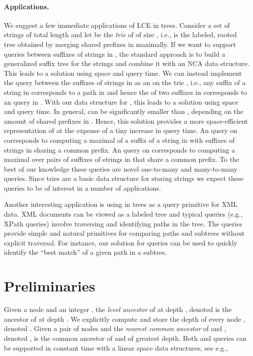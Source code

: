 \documentclass [10pt]{article}
\begin{document}
\paragraph{\bf Applications.}
We suggest a few immediate applications of LCE in trees. Consider a set of strings  of total length  and let  be the \emph{trie} of  of size , i.e.,  is the labeled, rooted tree obtained by merging shared prefixes in  maximally. If we want to support  queries between suffixes of strings in , the standard approach is to build a generalized suffix tree for the strings and combine it with an NCA data structure. This leads to a solution using  space and  query time. We can instead implement the  query between the suffixes of strings in  as an  on the trie , i.e., any suffix of a string in  corresponds to a path in  and hence the  of two suffixes in  corresponds to an  query in . With our data structure for  , this leads to  a solution using  space and  query time. In general,  can be significantly smaller than , depending on the amount of shared prefixes in .  Hence, this solution provides a more space-efficient representation of  at the expense of a tiny increase in query time. An  query on  corresponds to computing a maximal  of a suffix of a string in  with suffixes of strings in  sharing a common prefix. An  query on  corresponds to computing a maximal  over pairs of suffixes of strings in  that share a common prefix. To the best of our knowledge these queries are novel one-to-many and many-to-many  queries. Since tries are a basic data structure for storing strings we expect these queries to be of interest in a number of applications.

Another interesting application is using  in trees as a query primitive for XML data. XML documents can be viewed as a labeled tree and typical queries (e.g., XPath queries) involve traversing and identifying paths in the tree. The  queries provide simple and natural primitives for comparing paths and subtrees without explicit traversal. For instance, our  solution for  queries can be used to quickly identify the ``best match'' of a given path in a subtree.


\section{Preliminaries} 

Given a node  and an integer , the \emph{level ancestor} of  at depth , denoted  is the ancestor of  at depth .
We explicitly compute and store the depth of every node , denoted .
Given a pair of nodes  and  the \emph{nearest common ancestor} of  and , denoted , is the common ancestor of  and  of greatest depth. Both  and  queries can be supported in constant time with a linear space data structures, see e.g.,~\cite{BV1994, Dietz1991, BFC2004, AH2000, GRV2006, AGKR2004,HT1984, BFC2000, FH2011}
\end{document}
